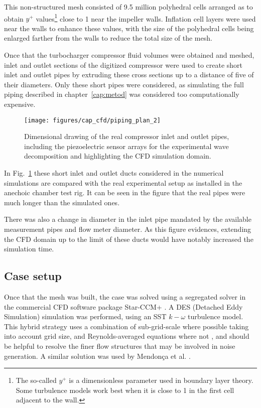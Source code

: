 This non-structured mesh consisted of 9.5 million polyhedral cells arranged as to obtain $y^+$ values\footnote{The so-called $y^+$ is a dimensionless parameter used in boundary layer theory. Some turbulence models work best when it is close to 1 in the first cell adjacent to the wall.} close to 1 near the impeller walls. Inflation cell layers were used near the walls to enhance these values, with the size of the polyhedral cells being enlarged farther from the walls to reduce the total size of the mesh.

Once that the turbocharger compressor fluid volumes were obtained and meshed, inlet and outlet sections of the digitized compressor were used to create short inlet and outlet pipes by extruding these cross sections up to a distance of five of their diameters. Only these short pipes were considered, as simulating the full piping described in chapter~\ref{cap:metod} was considered too computationally expensive. 

\begin{figure}
\centering
\texttt{[image: figures/cap\_cfd/piping\_plan\_2]}
\caption[Dimensional drawing of the compressor inlet and outlet pipes]{Dimensional drawing of the real compressor inlet and outlet pipes, including the piezoelectric sensor arrays for the experimental wave decomposition and highlighting the CFD simulation domain.}
\label{fig:cfd_piping_plan}
\end{figure}

In Fig.~\ref{fig:cfd_piping_plan} these short inlet and outlet ducts considered in the numerical simulations are compared with the real experimental setup as installed in the anechoic chamber test rig. It can be seen in the figure that the real pipes were much longer than the simulated ones. 

There was also a change in diameter in the inlet pipe mandated by the available measurement pipes and flow meter diameter. As this figure evidences, extending the CFD domain up to the limit of these ducts would have notably increased the simulation time.

\subsection{Case setup}

Once that the mesh was built, the case was solved using a segregated solver in the commercial CFD software package Star-CCM+ \cite{starccm}. A DES (Detached Eddy Simulation) simulation was performed, using an SST $k-\omega$ turbulence model. This hybrid strategy \cite{shur2008hybrid} uses a combination of sub-grid-scale where possible taking into account grid size, and Reynolds-averaged equations where not \cite{travin2000detached}, and should be helpful to resolve the finer flow structures that may be involved in noise generation. A similar solution was used by Mendonça et al. \cite{baris2011automotive,mendonca2012simulation}.

